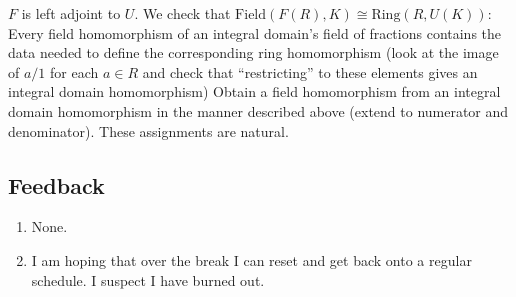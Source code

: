 \documentclass[11pt]{article}
\begin{document}
\begin{enumerate}
\begin{enumerate}[label=(\roman*)]
        $F$ is left adjoint to $U$. We check that $\text{Field}(F(R), K)\cong \text{Ring}(R,U(K))$: Every field homomorphism of an integral domain's field of fractions contains the data needed to define the corresponding ring homomorphism (look at the image of $a/1$ for each $a\in R$ and check that ``restricting'' to these elements gives an integral domain homomorphism) Obtain a field homomorphism from an integral domain homomorphism in the manner described above (extend to numerator and denominator). These assignments are natural.
    \end{enumerate}
\end{enumerate}
\subsection*{Feedback}
\begin{enumerate}
    \item None.
    \item I am hoping that over the break I can reset and get back onto a regular schedule. I suspect I have burned out.
\end{enumerate}
\end{document}
